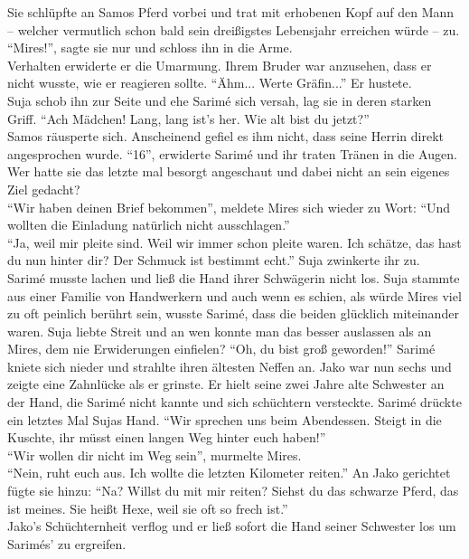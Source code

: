 Sie schlüpfte an Samos Pferd vorbei und trat mit erhobenen Kopf auf den Mann – welcher vermutlich 
schon bald sein dreißigstes Lebensjahr erreichen würde – zu. ``Mires!'', sagte sie nur und schloss 
ihn in die Arme. \\
Verhalten erwiderte er die Umarmung. Ihrem Bruder war anzusehen, dass er nicht wusste, wie er 
reagieren sollte. ``Ähm... Werte Gräfin...'' Er hustete.\\
Suja schob ihn zur Seite und ehe Sarimé sich versah, lag sie in deren starken Griff. 
``Ach Mädchen! Lang, lang ist's her. Wie alt bist du jetzt?''\\
Samos räusperte sich. Anscheinend gefiel es ihm nicht, dass seine Herrin direkt angesprochen wurde.
``16'', erwiderte Sarimé und ihr traten Tränen in die Augen. Wer hatte sie das letzte mal besorgt 
angeschaut und dabei nicht an sein eigenes Ziel gedacht? \\
``Wir haben deinen Brief bekommen'', meldete Mires sich wieder zu Wort: ``Und wollten die Einladung 
natürlich nicht ausschlagen.''\\
``Ja, weil mir pleite sind. Weil wir immer schon pleite waren. Ich schätze, das hast du nun hinter 
dir? Der Schmuck ist bestimmt echt.'' Suja zwinkerte ihr zu. \\
Sarimé musste lachen und ließ die Hand ihrer Schwägerin nicht los. Suja stammte aus einer Familie 
von Handwerkern und auch wenn es schien, als würde Mires viel zu oft peinlich berührt sein, wusste 
Sarimé, dass die beiden glücklich miteinander waren. Suja liebte Streit und an wen konnte man das 
besser auslassen als an Mires, dem nie Erwiderungen einfielen?
``Oh, du bist groß geworden!'' Sarimé kniete sich nieder und strahlte ihren ältesten Neffen an. 
Jako war nun sechs und zeigte eine Zahnlücke als er grinste. Er hielt seine zwei Jahre alte 
Schwester an der Hand, die Sarimé nicht kannte und sich schüchtern versteckte. Sarimé drückte ein 
letztes Mal Sujas Hand. ``Wir sprechen uns beim Abendessen. Steigt in die Kuschte, ihr müsst einen 
langen Weg hinter euch haben!''\\
``Wir wollen dir nicht im Weg sein'', murmelte Mires.\\
``Nein, ruht euch aus. Ich wollte die letzten Kilometer reiten.'' An Jako gerichtet fügte sie 
hinzu: ``Na? Willst du mit mir reiten? Siehst du das schwarze Pferd, das ist meines. Sie heißt Hexe, 
weil sie oft so frech ist.''\\
Jako's Schüchternheit verflog und er ließ sofort die Hand seiner Schwester los um Sarimés' zu 
ergreifen. \\


